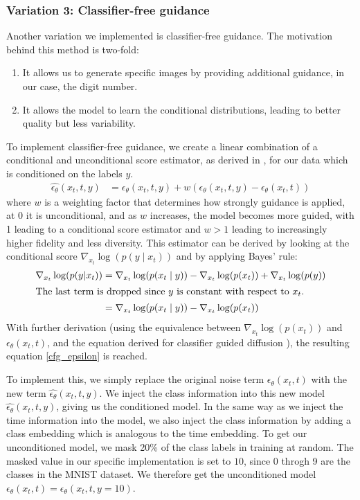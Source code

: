 \subsubsection{Variation 3: Classifier-free guidance}
Another variation we implemented is classifier-free guidance.
The motivation behind this method is two-fold:
\begin{enumerate}
  \item It allows us to generate specific images by providing additional guidance, in our case, the digit number.
  \item It allows the model to learn the conditional distributions, leading to better quality but less variability.
\end{enumerate}



To implement classifier-free guidance, we create a linear combination of a conditional and unconditional score estimator, as derived in \cite{classifier_free_guidance}, for our data which is conditioned on the labels
$y$.
\begin{align}
  \hat{\epsilon_\theta}(x_t, t, y) &= \epsilon_\theta(x_t, t, y) + w (\epsilon_\theta(x_t, t, y) - \epsilon_\theta(x_t, t))\label{cfg_epsilon}
\end{align}
where $w$ is a weighting factor that determines how strongly guidance is applied, at 0 it is unconditional, and as $w$ increases, the model becomes more guided,
with 1 leading to a conditional score estimator and $w > 1$ leading to increasingly higher fidelity and less diversity.
This estimator can be derived by looking at the conditional score $\nabla_{x_t} \log (p(y \mid x_t))$
and by applying Bayes' rule:
\begin{align}
  \nabla_{x_t} \log (p(y|x_t)) &= \nabla_{x_t} \log (p(x_t \mid y)) - \nabla_{x_t} \log (p(x_t)) + \nabla_{x_t} \log (p(y))\\
  \intertext{The last term is dropped since $y$ is constant with respect to $x_t$.}
  &= \nabla_{x_t} \log (p(x_t \mid y)) - \nabla_{x_t} \log (p(x_t))
\end{align}
With further derivation (using the equivalence between $\nabla_{x_t} \log (p(x_t))$ and $\epsilon_\theta(x_t, t)$, and the equation derived for classifier guided diffusion \cite{classifier_free_guidance}), the resulting equation \ref{cfg_epsilon} is reached. 

To implement this, we simply replace the original noise term $\epsilon_\theta(x_t, t)$ with the new term $\hat{\epsilon_\theta}(x_t, t, y)$.
We inject the class information into this new model $\hat{\epsilon_\theta}(x_t, t, y)$, giving us 
the conditioned model.
In the same way as we inject the time information into the model, we also inject the class information by adding a class embedding
which is analogous to the time embedding.
To get our unconditioned model, we mask 20\% of the class labels in training at random.
The masked value in our specific implementation is set to $10$, since 0 throgh 9 are 
the classes in the MNIST dataset.
We therefore get the unconditioned model $\epsilon_\theta(x_t, t) = \epsilon_\theta(x_t, t, y=10)$.

